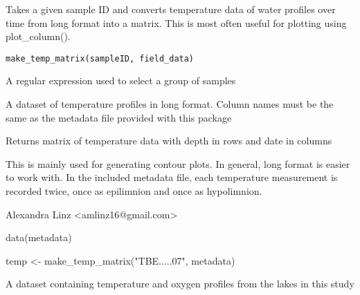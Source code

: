 \documentclass[a4paper]{book}
\begin{document}
%
\begin{Description}\relax
Takes a given sample ID and converts temperature data of water profiles over time from long format into a matrix. This is most often useful for plotting using plot\_column().
\end{Description}
%
\begin{Usage}
\begin{verbatim}
make_temp_matrix(sampleID, field_data)
\end{verbatim}
\end{Usage}
%
\begin{Arguments}
\begin{ldescription}
\item[\code{sampleID}] 
A regular expression used to select a group of samples

\item[\code{field\_data}] 
A dataset of temperature profiles in long format. Column names must be the same as the metadata file provided with this package

\end{ldescription}
\end{Arguments}
%
\begin{Value}
Returns matrix of temperature data with depth in rows and date in columns
\end{Value}
%
\begin{Note}\relax
This is mainly used for generating contour plots. In general, long format is easier to work with.
In the included metadata file, each temperature measurement is recorded twice, once as epilimnion and once as hypolimnion.
\end{Note}
%
\begin{Author}\relax
Alexandra Linz <amlinz16@gmail.com>
\end{Author}
%
\begin{Examples}
\begin{ExampleCode}
data(metadata)

temp <- make_temp_matrix("TBE.....07", metadata)
\end{ExampleCode}
\end{Examples}
%
\begin{Description}\relax
A dataset containing temperature and oxygen profiles from the lakes in this study

\end{Description}
\end{document}
